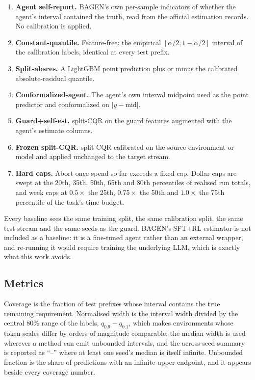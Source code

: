 \documentclass{article}
\begin{document}
\begin{enumerate}
  \item \textbf{Agent self-report.} BAGEN's own per-sample indicators of whether the
  agent's interval contained the truth, read from the official estimation records. No
  calibration is applied.
  \item \textbf{Constant-quantile.} Feature-free: the empirical $[\alpha/2,
  1{-}\alpha/2]$ interval of the calibration labels, identical at every test prefix.
  \item \textbf{Split-absres.} A LightGBM point prediction plus or minus the calibrated
  absolute-residual quantile.
  \item \textbf{Conformalized-agent.} The agent's own interval midpoint used as the
  point predictor and conformalized on $|y - \mathrm{mid}|$.
  \item \textbf{Guard+self-est.} split-CQR on the guard features augmented with the
  agent's estimate columns.
  \item \textbf{Frozen split-CQR.} split-CQR calibrated on the source environment or
  model and applied unchanged to the target stream.
  \item \textbf{Hard caps.} Abort once spend so far exceeds a fixed cap. Dollar caps
  are swept at the 20th, 35th, 50th, 65th and 80th percentiles of realised run totals,
  and week caps at $0.5\times$ the 25th, $0.75\times$ the 50th and $1.0\times$ the 75th
  percentile of the task's time budget.
\end{enumerate}

Every baseline sees the same training split, the same calibration split, the same test
stream and the same seeds as the guard. BAGEN's SFT+RL estimator is not included as a
baseline: it is a fine-tuned agent rather than an external wrapper, and re-running it
would require training the underlying LLM, which is exactly what this work avoids.

\subsection{Metrics}

Coverage is the fraction of test prefixes whose interval contains the true remaining
requirement. Normalised width is the interval width divided by the central 80\% range
of the labels, $q_{0.9}{-}q_{0.1}$, which makes environments whose token scales differ
by orders of magnitude comparable; the median width is used wherever a method can emit
unbounded intervals, and the across-seed summary is reported as ``--'' where at least
one seed's median is itself infinite. Unbounded fraction is the share of predictions
with an infinite upper endpoint, and it appears beside every coverage number.
\end{document}
